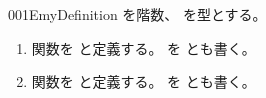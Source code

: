 \documentclass[index]{subfiles}
\begin{document}
\begin{myBlock}{001E}{myDefinition}
  を階数、
  を型とする。
  \begin{enumerate}
  \item 関数を
    と定義する。
    を
    とも書く。
  \item 関数を
    と定義する。
    を
    とも書く。
  \end{enumerate}
\end{myBlock}
\end{document}
